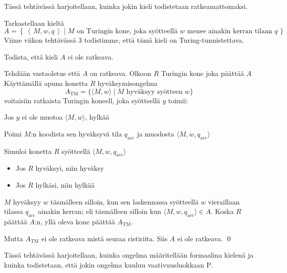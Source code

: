 \documentclass[12pt,a4paper]{article}
\newcommand{\set}[1]{\left\{\,#1\,\right\}}
\newcommand{\code}[1]{\left\langle\,#1\,\right\rangle}
\newcommand{\Pee}{\mathrm{P}}
\begin{document}
\pagebreak
{} Tässä tehtävässä harjoitellaan, kuinka jokin kieli todistetaan ratkeamattomaksi.
    
Tarkastellaan kieltä
\[A=\set{\code{M,w,q}\mid
\mbox{$M$ on Turingin kone, joka syötteellä $w$ menee ainakin kerran
  tilaan $q$}}.\] Viime viikon tehtävässä 3 todistimme, että tämä kieli on Turing-tunnistettava.

Todista, että kieli $A$ ei ole ratkeava.\\

\bigskip

    
Tehdään vastaoletus että $A$ on ratkeava. Olkoon $R$ Turingin kone
joka päättää $A$\\

Käyttämällä apuna konetta $R$ hyväksymisongelma
\[
A_{\mathrm{TM}}=\{\langle M,w\rangle \mid \text{$M$ hyväksyy syötteen $w$}\}
\]
voitaisiin ratkaista Turingin koneell, joka syötteellä $y$ toimii:
\begin{alakohta}
\item Jos $y$ ei ole muotoa $\langle M,w\rangle$, hylkää

\item Poimi $M$:n koodista sen hyväksyvä tila $q_{\mathrm{acc}}$ ja muodosta
      $\langle M,w,q_{\mathrm{acc}}\rangle$

\item Simuloi konetta $R$ syötteellä $\langle M,w,q_{\mathrm{acc}}\rangle$
      \begin{itemize}
        \item Jos $R$ hyväksyi, niin hyväksy
        \item Jos $R$ hylkäsi, niin hylkää
      \end{itemize}
\end{alakohta}

$M$ hyväksyy $w$ täsmälleen silloin, kun sen laskennassa
syötteellä $w$ vieraillaan tilassa $q_{\mathrm{acc}}$ ainakin kerran;
eli täsmälleen silloin kun $\langle M,w,q_{\mathrm{acc}}\rangle\in A$.
Koska $R$ päättää $A$:n, yllä oleva kone päättää $A_{\mathrm{TM}}$.

Mutta $A_{\mathrm{TM}}$ ei ole ratkeava mistä seuraa ristiriita. Siis $A$ ei ole ratkeava. \qed








\pagebreak
\exercise{3 Vaativuusluokka $\Pee$} Tässä tehtävässä harjoitellaan, kuinka ongelma määritellään formaalina kielenä ja kuinka todistetaan, että jokin ongelma kuuluu vaativuusluokkaan $\Pee$.
  
\end{document}
